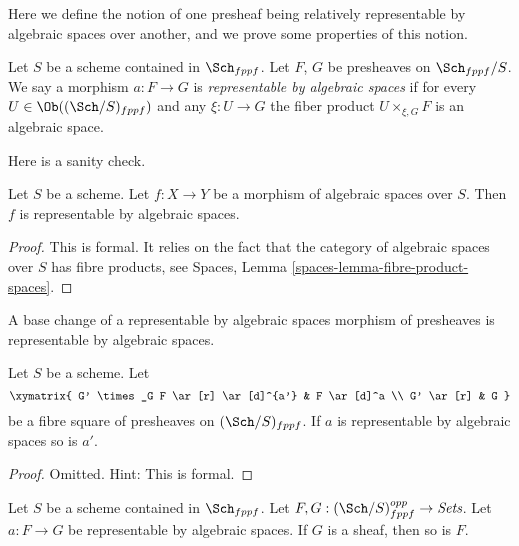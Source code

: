 \noindent
Here we define the notion of one presheaf being relatively representable
by algebraic spaces over another, and we prove some properties of this notion.

\begin{definition}
\label{definition-morphism-representable-by-spaces}
Let $S$ be a scheme contained in $\Sch_{fppf}$.
Let $F$, $G$ be presheaves on $\Sch_{fppf}/S$.
We say a morphism $a : F \to G$ is
{\it representable by algebraic spaces}
if for every $U \in \Ob((\Sch/S)_{fppf})$ and
any $\xi : U \to G$ the fiber product $U \times_{\xi, G} F$
is an algebraic space.
\end{definition}

\noindent
Here is a sanity check.

\begin{lemma}
\label{lemma-morphism-spaces-is-representable-by-spaces}
Let $S$ be a scheme.
Let $f : X \to Y$ be a morphism of algebraic spaces over $S$.
Then $f$ is representable by algebraic spaces.
\end{lemma}

\begin{proof}
This is formal. It relies on the fact that
the category of algebraic spaces over $S$ has fibre products, see
Spaces, Lemma \ref{spaces-lemma-fibre-product-spaces}.
\end{proof}

\begin{lemma}
\label{lemma-base-change-transformation}
\begin{slogan}
A base change of a representable by algebraic spaces morphism of
presheaves is representable by algebraic spaces.
\end{slogan}
Let $S$ be a scheme. Let
$$
\xymatrix{
G' \times_G F \ar[r] \ar[d]^{a'} & F \ar[d]^a \\
G' \ar[r] & G
}
$$
be a fibre square of presheaves on $(\Sch/S)_{fppf}$.
If $a$ is representable by algebraic spaces so is $a'$.
\end{lemma}

\begin{proof}
Omitted. Hint: This is formal.
\end{proof}

\begin{lemma}
\label{lemma-representable-by-spaces-transformation-to-sheaf}
Let $S$ be a scheme contained in $\Sch_{fppf}$.
Let $F, G : (\Sch/S)_{fppf}^{opp} \to \textit{Sets}$.
Let $a : F \to G$ be representable by algebraic spaces.
If $G$ is a sheaf, then so is $F$.
\end{lemma}

